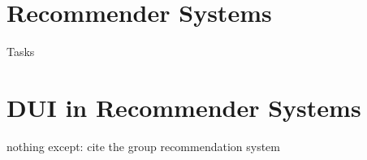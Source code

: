 \section{Recommender Systems}
Tasks

\section{DUI in Recommender Systems}
nothing except: cite the group recommendation system
